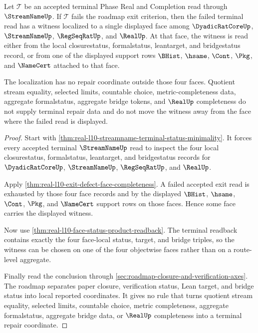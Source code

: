 \begin{theorem}
\label{thm:real-l10-terminal-four-face-defect-localization}
Let $\mathcal T$ be an accepted terminal Phase Real and Completion read
through $\StreamNameUp$. If $\mathcal T$ fails the roadmap exit criterion,
then the failed terminal read has a witness localized to a single displayed
face among
$\DyadicRatCoreUp$, $\StreamNameUp$, $\RegSeqRatUp$, and $\RealUp$.
At that face, the witness is read either from the local closurestatus,
formalstatus, leantarget, and bridgestatus record, or from one of the
displayed support rows $\BHist$, $\hsame$, $\Cont$, $\Pkg$, and $\NameCert$
attached to that face.

The localization has no repair coordinate outside those four faces.
Quotient stream equality, selected limits, countable choice,
metric-completeness data, aggregate formalstatus, aggregate bridge tokens,
and $\RealUp$ completeness do not supply terminal repair data and do not move
the witness away from the face where the failed read is displayed.
\end{theorem}
\begin{proof}
Start with \autoref{thm:real-l10-streamname-terminal-status-minimality}. It
forces every accepted terminal $\StreamNameUp$ read to inspect the four local
closurestatus, formalstatus, leantarget, and bridgestatus records for
$\DyadicRatCoreUp$, $\StreamNameUp$, $\RegSeqRatUp$, and $\RealUp$.

Apply \autoref{thm:real-l10-exit-defect-face-completeness}. A failed accepted
exit read is exhausted by those four face records and by the displayed
$\BHist$, $\hsame$, $\Cont$, $\Pkg$, and $\NameCert$ support rows on those
faces. Hence some face carries the displayed witness.

Now use \autoref{thm:real-l10-face-status-product-readback}. The terminal
readback contains exactly the four face-local status, target, and bridge
triples, so the witness can be chosen on one of the four objectwise faces
rather than on a route-level aggregate.

Finally read the conclusion through
\autoref{sec:roadmap-closure-and-verification-axes}. The roadmap separates
paper closure, verification status, Lean target, and bridge status into local
reported coordinates. It gives no rule that turns quotient stream equality,
selected limits, countable choice, metric completeness, aggregate
formalstatus, aggregate bridge data, or $\RealUp$ completeness into a
terminal repair coordinate.
\end{proof}

